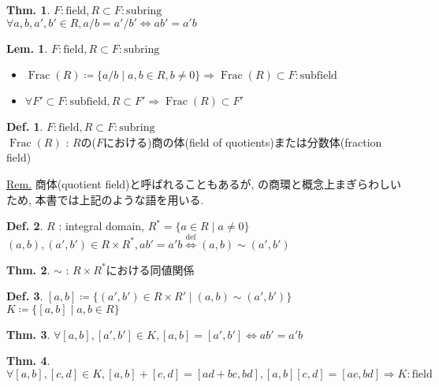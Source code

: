 \documentclass[uplatex,dvipdfmx,9pt]{beamer}
\newcommand{\defarrow}{\overset{\mathrm{def}}{\Leftrightarrow}}
\newcommand{\Frac}[1]{\operatorname{Frac}(#1)}
\newcounter{textLemCount}
\theoremstyle{definition} %
\newtheorem{defn}{Def.}[subsection] %
\newtheorem{thm}{Thm.}[subsection] %
\newtheorem{lemText}[textLemCount]{Lem.} %
\theoremstyle{example}
\begin{document}
    \begin{frame}

      \begin{thm}
        $F : \text{field}, R \subset F : \text{subring}$ \\
        $\forall a, b, a', b' \in R, a/b = a'/b' \Leftrightarrow ab' = a'b$
      \end{thm}

      \begin{lemText}
        $F : \text{field}, R \subset F : \text{subring}$ \\
        \begin{itemize}
          \item $\Frac{R} \coloneqq \{a/b \mid a,b \in R, b \neq 0\} \Rightarrow \Frac{R} \subset F : \text{subfield}$ 
          \item $\forall F' \subset F : \text{subfield}, R \subset F' \Rightarrow \Frac{R} \subset F'$
        \end{itemize}
      \end{lemText}

      \begin{defn}
        $F : \text{field}, R \subset F : \text{subring}$ \\
        $\Frac{R}$ : $R$の($F$における)\alert{商の体(field of quotients)}または\alert{分数体(fraction field)}
      \end{defn}
      \underline{Rem.} 商体(quotient field)と呼ばれることもあるが,  の商環と概念上まぎらわしいため, 本書では上記のような語を用いる.
      
    \end{frame}

    \begin{frame}

      \begin{defn}
        $R$ : integral domain, $R^* = \{ a \in R \mid a \neq 0\}$ \\
        $(a, b), (a', b') \in R \times R^*, ab' = a'b \defarrow (a, b) \sim (a', b')$
      \end{defn}

      \begin{thm}
        $\sim$ : $R \times R^*$における同値関係
      \end{thm}

      \begin{defn}
        $[a, b] \coloneqq \{(a', b') \in R \times R' \mid (a, b) \sim (a', b')\}$ \\
        $K \coloneqq \{[a, b] \mid a, b \in R\}$
      \end{defn}

      \begin{thm}
        $\forall [a, b], [a', b'] \in K, [a, b] = [a', b'] \Leftrightarrow ab' = a'b$
      \end{thm}

      \begin{thm}
        $\forall [a, b], [c, d] \in K, [a, b] + [c, d] = [ad + bc, bd], [a, b][c, d] = [ac, bd] \Rightarrow K : \text{field}$
      \end{thm}
      
    \end{frame}
\end{document}
